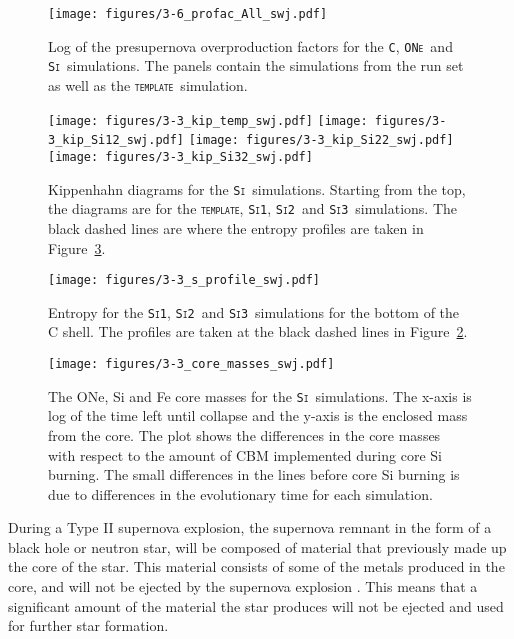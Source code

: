 \documentclass[useAMS,usenatbib]{mn2e}
\newcommand{\template}{\textsc{\texttt{template}}}
\newcommand{\Sia}{\textsc{\texttt{Si1}}}
\newcommand{\Sib}{\textsc{\texttt{Si2}}}
\newcommand{\Sic}{\textsc{\texttt{Si3}}}
\newcommand{\C}{\textsc{\texttt{C}}}
\newcommand{\ONe}{\textsc{\texttt{ONe}}}
\newcommand{\Si}{\textsc{\texttt{Si}}}
\begin{document}
\begin{figure}
	\texttt{[image: figures/3-6\_profac\_All\_swj.pdf]}
	\caption{
		Log of the presupernova overproduction factors for
		the \C, \ONe\ and \Si\ simulations. The panels contain the simulations 
		from the run set as well as the \template~simulation.
	}
	\label{fig:profac} %
\end{figure}

\begin{figure}
	\texttt{[image: figures/3-3\_kip\_temp\_swj.pdf]}
	\texttt{[image: figures/3-3\_kip\_Si12\_swj.pdf]}
	\texttt{[image: figures/3-3\_kip\_Si22\_swj.pdf]}
	\texttt{[image: figures/3-3\_kip\_Si32\_swj.pdf]}
	\caption{
		Kippenhahn diagrams for the \Si\ simulations. Starting from the top, 
		the diagrams are for the \template, \Sia, \Sib\ and \Sic\ simulations. 
		The black dashed lines are where the entropy profiles are taken in 
		Figure~\ref{fig:3.3.1_s}.
	}
	\label{fig:3.3.1} %
\end{figure}

\begin{figure}
	\texttt{[image: figures/3-3\_s\_profile\_swj.pdf]}
	\caption{
		Entropy for the \Sia, \Sib\ and \Sic\ simulations for the bottom of 
		the C shell. The profiles are taken at the black dashed lines in 
		Figure~\ref{fig:3.3.1}.
	}
	\label{fig:3.3.1_s} %
\end{figure}

\begin{figure}
	\texttt{[image: figures/3-3\_core\_masses\_swj.pdf]}
	\caption{
		The ONe, Si and Fe core masses for the \Si\ simulations. The 
		x-axis is log of the time left until collapse and the y-axis is the 
		enclosed mass from the core. The plot shows the differences 
		in the core masses with respect to the amount of CBM implemented 
		during core Si burning. The small differences in the lines before core 
		Si burning is due to differences in the evolutionary time for each simulation.
	}
	\label{fig:3.3.1_cm} %
\end{figure}

During a Type II supernova explosion, the supernova remnant in the form of a
black hole or neutron star, will be composed of material that previously made up
the core of the star. This material consists of some of the metals produced in 
the core, and will not be ejected by the supernova explosion
\citep[see, e.g.][and references therein]{Colgate1966,Fryer2009,Janka2012,
Ugliano2012,Ertl2016}. This means that a significant amount of the material 
the star produces will not be ejected and used for further star formation. 
\end{document}
